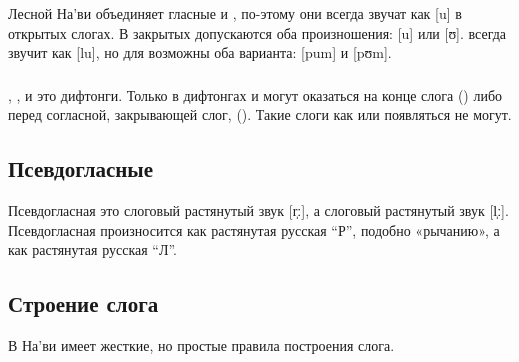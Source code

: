 \subsubsection{} Лесной На'ви объединяет гласные  и , 
по-этому они всегда звучат как [u] в открытых слогах. В закрытых допускаются оба произношения: [u]
или [ʊ].   всегда звучит как [lu],
но для  возможны оба варианта: [pum] и [pʊm].


\subsubsection{}  , ,  и  это дифтонги.
Только в дифтонгах  и  могут оказаться на конце слога () либо перед согласной, закрывающей слог, (). Такие слоги как  или  появляться не могут.

\subsection{Псевдогласные} Псевдогласная  это слоговый растянутый звук [r̩ː], а  слоговый растянутый звук [l̩ː]. Псевдогласная  произносится как растянутая русская ``Р'', подобно «рычанию», а  как растянутая русская ``Л''.

\subsection{Строение слога}
 В На'ви имеет жесткие, но простые правила построения слога.

